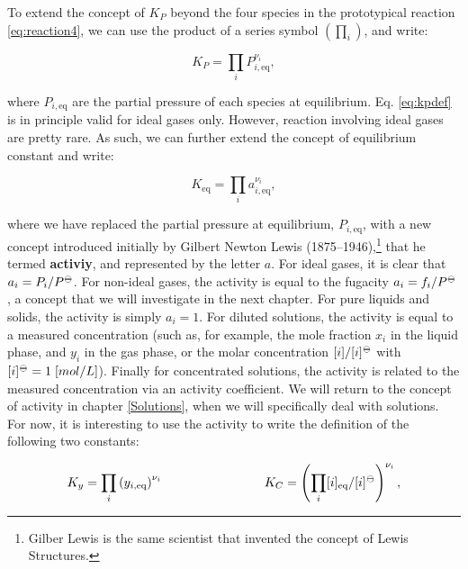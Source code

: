 \documentclass[
]{book}
\theoremstyle{definition}
\theoremstyle{definition}
\theoremstyle{definition}
\theoremstyle{remark}
\begin{document}
To extend the concept of \(K_P\) beyond the four species in the prototypical reaction \eqref{eq:reaction4}, we can use the product of a series symbol \(\left( \prod_i \right)\), and write:

\begin{equation}
K_P=\prod_i P_{i,\text{eq}}^{\nu_i},
\label{eq:kpdef}
\end{equation}

where \(P_{i,\text{eq}}\) are the partial pressure of each species at equilibrium. Eq. \eqref{eq:kpdef} is in principle valid for ideal gases only. However, reaction involving ideal gases are pretty rare. As such, we can further extend the concept of equilibrium constant and write:

\begin{equation}
K_{\text{eq}} =\prod_i a_{i,\text{eq}}^{\nu_i},
\label{eq:kdef}
\end{equation}

where we have replaced the partial pressure at equilibrium, \(P_{i,\text{eq}}\), with a new concept introduced initially by Gilbert Newton Lewis (1875--1946),\footnote{Gilber Lewis is the same scientist that invented the concept of Lewis Structures.} that he termed \textbf{activiy}, and represented by the letter \(a\). For ideal gases, it is clear that \(a_i=P_i/P^{-\kern-6pt{\ominus}\kern-6pt-}\). For non-ideal gases, the activity is equal to the fugacity \(a_i=f_i/P^{-\kern-6pt{\ominus}\kern-6pt-}\), a concept that we will investigate in the next chapter. For pure liquids and solids, the activity is simply \(a_i=1\). For diluted solutions, the activity is equal to a measured concentration (such as, for example, the mole fraction \(x_i\) in the liquid phase, and \(y_i\) in the gas phase, or the molar concentration \([i]/[i]^{-\kern-6pt{\ominus}\kern-6pt-}\) with \([i]^{-\kern-6pt{\ominus}\kern-6pt-}= 1\;\text[mol/L]\)). Finally for concentrated solutions, the activity is related to the measured concentration via an activity coefficient. We will return to the concept of activity in chapter \ref{Solutions}, when we will specifically deal with solutions. For now, it is interesting to use the activity to write the definition of the following two constants:

\begin{equation}
K_y =\prod_i \left( y_{i,\text{eq}} \right)^{\nu_i} \qquad \qquad \qquad \qquad K_C =\left( \prod_i [i]_{\text{eq}}/[i]^{-\kern-6pt{\ominus}\kern-6pt-}\right)^{\nu_i},
\label{eq:kxkcdef}
\end{equation}
\end{document}
